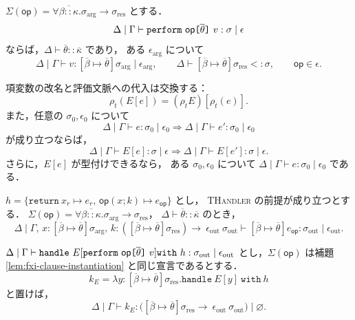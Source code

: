 \begin{lemma}[操作呼出しの型付けの反転]
\label{lem:fxi-perform-inversion}
$\Sigma(\mathsf{op})=
\forall\overline{\beta::\kappa}.
\sigma_{\mathrm{arg}}\to\sigma_{\mathrm{res}}$ とする．
\[
  \Delta\mid\Gamma\vdash
    \texttt{perform}~\mathsf{op}
      \texttt{[} \overline{\theta} \texttt{]}~v:
      \sigma\mid\epsilon
\]
ならば，$\Delta\vdash\overline{\theta}::\overline{\kappa}$ であり，
ある $\epsilon_{\mathrm{arg}}$ について
\[
  \Delta\mid\Gamma\vdash
    v:[\overline{\beta}\mapsto\overline{\theta}]
      \sigma_{\mathrm{arg}}
      \mid\epsilon_{\mathrm{arg}},
  \qquad
  \Delta\vdash
    [\overline{\beta}\mapsto\overline{\theta}]
      \sigma_{\mathrm{res}}<:\sigma,
  \qquad
  \mathsf{op}\in\epsilon.
\]
\end{lemma}

\begin{lemma}
\label{lem:fxi-context}
項変数の改名と評価文脈への代入は交換する：
\[
  \rho_t(E[e])=(\rho_t E)[\rho_t(e)].
\]
また，任意の $\sigma_0,\epsilon_0$ について
\[
  \Delta\mid\Gamma\vdash e:\sigma_0\mid\epsilon_0
  \Longrightarrow
  \Delta\mid\Gamma\vdash e':\sigma_0\mid\epsilon_0
\]
が成り立つならば，
\[
  \Delta\mid\Gamma\vdash E[e]:\sigma\mid\epsilon
  \Longrightarrow
  \Delta\mid\Gamma\vdash E[e']:\sigma\mid\epsilon.
\]
さらに，$E[e]$ が型付けできるなら，
ある $\sigma_0,\epsilon_0$ について
$\Delta\mid\Gamma\vdash e:\sigma_0\mid\epsilon_0$ である．
\end{lemma}

\begin{lemma}[多相操作節の具体化]
\label{lem:fxi-clause-instantiation}
$h=\{\texttt{return}~x_r\mapsto e_r,\,
  \mathsf{op}(x;k)\mapsto e_{\mathsf{op}}\}$ とし，
\textsc{THandler} の前提が成り立つとする．
$\Sigma(\mathsf{op})=
\forall\overline{\beta::\kappa}.
\sigma_{\mathrm{arg}}\to\sigma_{\mathrm{res}}$，
$\Delta\vdash\overline{\theta}::\overline{\kappa}$ のとき，
\[
  \Delta\mid
  \Gamma,\,
  x:[\overline{\beta}\mapsto\overline{\theta}]
      \sigma_{\mathrm{arg}},\,
  k:([\overline{\beta}\mapsto\overline{\theta}]
      \sigma_{\mathrm{res}})
      \rightarrow~\epsilon_{\mathrm{out}}~
      \sigma_{\mathrm{out}}
  \vdash
  [\overline{\beta}\mapsto\overline{\theta}]
    e_{\mathsf{op}}:
    \sigma_{\mathrm{out}}\mid\epsilon_{\mathrm{out}}.
\]
\end{lemma}

\begin{lemma}
\label{lem:fxi-resumption}
$\Delta\mid\Gamma\vdash
\texttt{handle}~
 E[\texttt{perform}~\mathsf{op}\texttt{[} \overline{\theta} \texttt{]}~v]
 \texttt{with}~h:
 \sigma_{\mathrm{out}}\mid\epsilon_{\mathrm{out}}$
とし，$\Sigma(\mathsf{op})$ は補題
\ref{lem:fxi-clause-instantiation} と同じ宣言であるとする．
\[
  k_E =
    \lambda y:
      [\overline{\beta}\mapsto\overline{\theta}]
        \sigma_{\mathrm{res}}.
    \texttt{handle}~E[y]~\texttt{with}~h
\]
と置けば，
\[
  \Delta\mid\Gamma\vdash k_E:
  \bigl(
    [\overline{\beta}\mapsto\overline{\theta}]
      \sigma_{\mathrm{res}}
    \rightarrow~\epsilon_{\mathrm{out}}~
      \sigma_{\mathrm{out}}
  \bigr)\mid\varnothing.
\]
\end{lemma}

